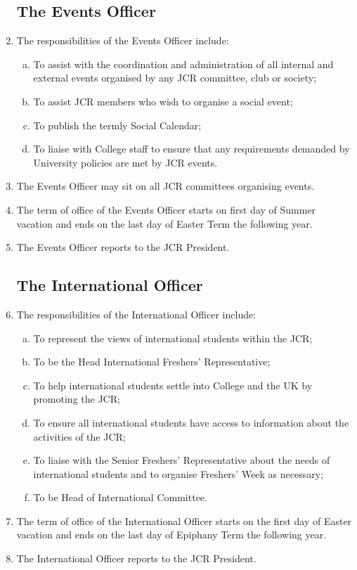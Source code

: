\documentclass[12pt]{article}
\begin{document}
\begin{enumerate}
    \subsection{The Events Officer}
    \item The responsibilities of the Events Officer include:
    \begin{enumerate}[(a)]
        \item To assist with the coordination and administration of all internal and external events organised by any JCR committee, club or society;
        \item To assist JCR members who wish to organise a social event;
        \item To publish the termly Social Calendar;
        \item To liaise with College staff to ensure that any requirements demanded by University policies are met by JCR events.
    \end{enumerate}
    \item The Events Officer may sit on all JCR committees organising events.
    \item The term of office of the Events Officer starts on first day of Summer vacation and ends on the last day of Easter Term the following year.
    \item The Events Officer reports to the JCR President.
    \subsection{The International Officer}
    \item The responsibilities of the International Officer include:
    \begin{enumerate}[(a)]
        \item To represent the views of international students within the JCR;
        \item To be the Head International Freshers' Representative;
        \item To help international students settle into College and the UK by promoting the JCR;
        \item To ensure all international students have access to information about the activities of the JCR;
        \item To liaise with the Senior Freshers' Representative about the needs of international students and to organise Freshers' Week as necessary;
        \item To be Head of International Committee.
    \end{enumerate}
    \item The term of office of the International Officer starts on the first day of Easter vacation and ends on the last day of Epiphany Term the following year.
    \item The International Officer reports to the JCR President.

\end{enumerate}
\end{document}
